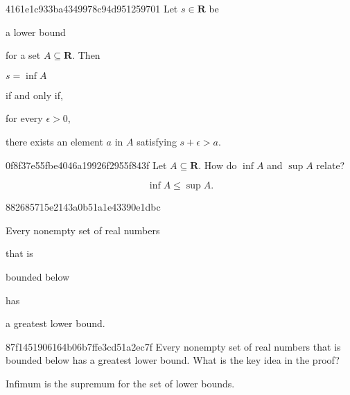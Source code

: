\begin{note}{4161e1c933ba4349978c94d951259701}
    Let \({ s \in \mathbf{R} }\) be \begin{icloze}{5}a lower bound\end{icloze} for a set \({ A \subseteq \mathbf{R} }\).
    Then \begin{icloze}{3}\({ s = \inf A }\)\end{icloze} \begin{icloze}{4}if and only if,\end{icloze} \begin{icloze}{2}for every \({ \epsilon > 0 }\),\end{icloze} \begin{icloze}{1}there exists an element \({ a }\) in \({ A }\) satisfying \({ s + \epsilon > a }\).\end{icloze}
\end{note}

\begin{note}{0f8f37e55fbe4046a19926f2955f843f}
    Let \({ A \subseteq \mathbf{R} }\). How do \({ \inf A }\) and \({ \sup A }\) relate?

    \begin{cloze}{1}
        \[
            \inf A \leq \sup A.
        \]
    \end{cloze}
\end{note}

\begin{note}{882685715e2143a0b51a1e43390e1dbc}
    \begin{icloze}{1}Every nonempty set of real numbers\end{icloze} that is \begin{icloze}{2}bounded below\end{icloze} has \begin{icloze}{3}a greatest lower bound.\end{icloze}
\end{note}

\begin{note}{87f1451906164b06b7ffe3cd51a2ec7f}
    Every nonempty set of real numbers that is bounded below has a greatest lower bound.
    What is the key idea in the proof?

    \begin{cloze}{1}
        Infimum is the supremum for the set of lower bounds.
    \end{cloze}
\end{note}



